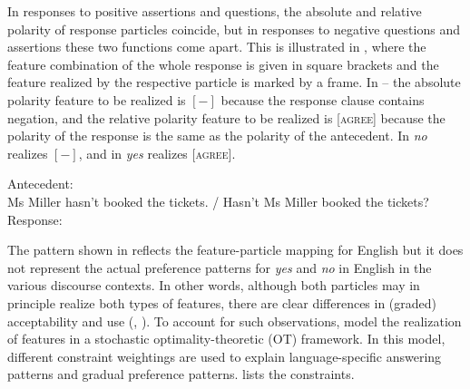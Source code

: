 \documentclass[output=paper,colorlinks,citecolor=brown]{langscibook}
\begin{document}
In responses to positive assertions and questions, the absolute and relative polarity of response particles coincide, but in responses to negative questions and assertions these two functions come apart. This is illustrated in , where the feature combination of the whole response is given in square brackets and the feature realized by the respective particle is marked by a frame. In -- the absolute polarity feature to be realized is $[-]$ because the response clause contains negation, and the relative polarity feature to be realized is [\textsc{agree}] because the polarity of the response is the same as the polarity of the antecedent. In  \textit{no} realizes $[-]$, and in  \textit{yes} realizes [\textsc{agree}].    


\ea\label{geist-repp:ex:MsMiller-tickets}
Antecedent:	\\
Ms Miller hasn't booked the tickets. / Hasn’t Ms Miller booked the tickets?\medskip\\
Response:
\z
\z

\noindent The pattern shown in  reflects the feature-particle mapping for English but it does not represent the actual preference patterns for \textit{yes} and \textit{no} in English in the various discourse contexts. In other words, although both particles may in principle realize both types of features, there are clear differences in (graded) acceptability and use (\citealt{RoelofsenFarkas2015}, \citealt{ReppMeijerScherf2019}). To account for such observations, \citet{FarkasRoelofsen2019} model the realization of features in a stochastic optimality-theoretic (OT) framework. In this model, different constraint weightings are used to explain language-specific answering patterns and gradual preference patterns.  lists the constraints.
\end{document}
